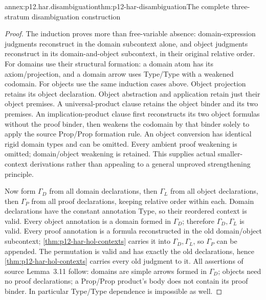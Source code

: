 \begin{annexitem}{annex:p12.har.disambiguation}{thm:p12-har-disambiguation}{The complete three-stratum disambiguation construction}
\begin{proof}
The induction proves more than free-variable absence: domain-expression
judgments reconstruct in the domain subcontext alone, and object judgments
reconstruct in its domain-and-object subcontext, in their original relative
order. For domains use their structural formation: a domain atom has its
axiom/projection, and a domain arrow uses Type/Type with a weakened codomain.
For objects use the same induction cases above. Object projection retains
its object declaration. Object abstraction and application retain just
their object premises. A universal-product clause retains the object
binder and its two premises. An implication-product clause first reconstructs
its two object formulas without the proof binder, then weakens the
codomain by that binder solely to apply the source Prop/Prop formation
rule. An object conversion has identical rigid domain types and can be
omitted. Every ambient proof weakening is omitted; domain/object weakening
is retained. This supplies actual smaller-context derivations rather
than appealing to a general unproved strengthening principle.

Now form \(\Gamma_D\) from all domain declarations, then
\(\Gamma_L\) from all object declarations, then \(\Gamma_P\) from all
proof declarations, keeping relative order within each. Domain declarations
have the constant annotation Type, so their reordered context is valid.
Every object annotation is a domain formed in \(\Gamma_D\); therefore
\(\Gamma_D,\Gamma_L\) is valid. Every proof annotation is a formula
reconstructed in the old domain/object subcontext; \cref{thm:p12-har-hol-contexts} carries it into
\(\Gamma_D,\Gamma_L\), so \(\Gamma_P\) can be appended. The permutation
is valid and has exactly the old declarations, hence \cref{thm:p12-har-hol-contexts} carries every
old judgment to it. All assertions of source Lemma~3.11 follow:
domains are simple arrows formed in \(\Gamma_D\); objects need no proof
declarations; a Prop/Prop product's body does not contain its proof binder.
In particular Type/Type dependence is impossible as well.
\end{proof}
\end{annexitem}

